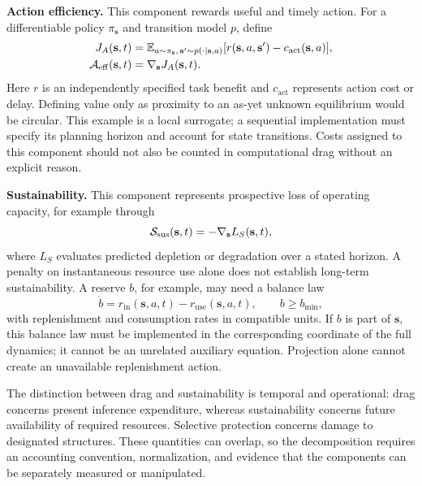 \textbf{Action efficiency.} This component rewards useful and timely action. For a differentiable policy $\pi_{\mathbf{s}}$ and transition model $p$, define
\begin{align}
 J_A(\mathbf{s},t)
 &=\mathbb{E}_{a\sim\pi_{\mathbf{s}},\,\mathbf{s}'\sim p(\cdot\mid\mathbf{s},a)}
       [r(\mathbf{s},a,\mathbf{s}')-c_{\mathrm{act}}(\mathbf{s},a)],
       \label{eq:action_value}\\
 \mathcal{A}_{\mathrm{eff}}(\mathbf{s},t)&=\nabla_{\mathbf{s}}J_A(\mathbf{s},t).
 \label{eq:action_eff}
\end{align}
Here $r$ is an independently specified task benefit and $c_{\mathrm{act}}$ represents action cost or delay. Defining value only as proximity to an as-yet unknown equilibrium would be circular. This example is a local surrogate; a sequential implementation must specify its planning horizon and account for state transitions. Costs assigned to this component should not also be counted in computational drag without an explicit reason.

\textbf{Sustainability.} This component represents prospective loss of operating capacity, for example through
\begin{equation}
 \mathcal{S}_{\mathrm{sus}}(\mathbf{s},t)=-\nabla_{\mathbf{s}}L_S(\mathbf{s},t),
 \label{eq:sustainability}
\end{equation}
where $L_S$ evaluates predicted depletion or degradation over a stated horizon. A penalty on instantaneous resource use alone does not establish long-term sustainability. A reserve $b$, for example, may need a balance law
\begin{equation}
 \dot b=r_{\mathrm{in}}(\mathbf{s},a,t)-r_{\mathrm{use}}(\mathbf{s},a,t),
 \qquad b\geq b_{\min},
 \label{eq:reserve}
\end{equation}
with replenishment and consumption rates in compatible units. If $b$ is part of $\mathbf{s}$, this balance law must be implemented in the corresponding coordinate of the full dynamics; it cannot be an unrelated auxiliary equation. Projection alone cannot create an unavailable replenishment action.

The distinction between drag and sustainability is temporal and operational: drag concerns present inference expenditure, whereas sustainability concerns future availability of required resources. Selective protection concerns damage to designated structures. These quantities can overlap, so the decomposition requires an accounting convention, normalization, and evidence that the components can be separately measured or manipulated.


